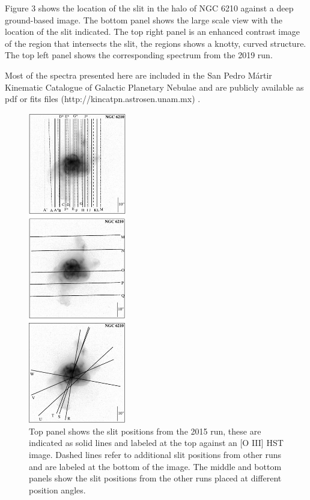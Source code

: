 \documentclass[useAMS, usenatbib]{mnras}
\begin{document}
Figure 3 shows the location of the slit in the halo of NGC 6210  against a deep ground-based image. The bottom panel shows the large scale view with the location of the slit indicated. The top right panel is an enhanced contrast image of the region that intersects the slit, the regions shows a knotty, curved structure. The top left panel shows the corresponding spectrum from the 2019 run.


Most of the spectra presented here are included in the San Pedro M\'artir Kinematic Catalogue of Galactic Planetary Nebulae and are publicly available as pdf or fits files (http://kincatpn.astrosen.unam.mx)
\citep{Lopez:2012a}.

 \begin{figure}
   \centering
   \includegraphics[width=0.38\textwidth]{tere-figs/Figure2a}
  \caption{Top panel shows the slit positions from the 2015 run, these are indicated as solid lines and 
labeled at the top against an [O III] HST image. Dashed lines refer to additional slit positions from other runs
and are labeled at the bottom of the image. The middle and bottom panels show the slit positions from 
the other runs placed at different position angles. }
  \label{fig:slit-positions}
\end{figure}
\end{document}
